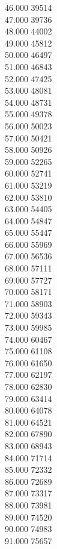 { 46.000	39514 \\
 47.000	39736 \\
 48.000	44002 \\
 49.000	45812 \\
 50.000	46497 \\
 51.000	46843 \\
 52.000	47425 \\
 53.000	48081 \\
 54.000	48731 \\
 55.000	49378 \\
 56.000	50023 \\
 57.000	50421 \\
 58.000	50926 \\
 59.000	52265 \\
 60.000	52741 \\
 61.000	53219 \\
 62.000	53810 \\
 63.000	54405 \\
 64.000	54847 \\
 65.000	55447 \\
 66.000	55969 \\
 67.000	56536 \\
 68.000	57111 \\
 69.000	57727 \\
 70.000	58171 \\
 71.000	58903 \\
 72.000	59343 \\
 73.000	59985 \\
 74.000	60467 \\
 75.000	61108 \\
 76.000	61650 \\
 77.000	62197 \\
 78.000	62830 \\
 79.000	63414 \\
 80.000	64078 \\
 81.000	64521 \\
 82.000	67890 \\
 83.000	68943 \\
 84.000	71714 \\
 85.000	72332 \\
 86.000	72689 \\
 87.000	73317 \\
 88.000	73981 \\
 89.000	74520 \\
 90.000	74983 \\
 91.000	75657 \\
}
